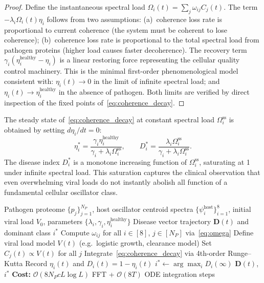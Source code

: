 \documentclass[twocolumn,11pt,a4paper]{article}
\theoremstyle{definition}
\theoremstyle{remark}
\newcommand{\bigO}{\mathcal{O}}
\begin{document}
\begin{proof}
Define the instantaneous spectral load $\Omega_i(t) = \sum_j \omega_{ij} C_j(t)$.
The term $-\lambda_i \Omega_i(t) \eta_i$ follows from two assumptions:
(a)~coherence loss rate is proportional to current coherence (the system must
be coherent to lose coherence); (b)~coherence loss rate is proportional to the
total spectral load from pathogen proteins (higher load causes faster
decoherence). The recovery term $\gamma_i(\eta_i^{\text{healthy}} - \eta_i)$ is
a linear restoring force representing the cellular quality control machinery.
This is the minimal first-order phenomenological model consistent with:
$\eta_i(t) \to 0$ in the limit of infinite spectral load; and
$\eta_i(t) \to \eta_i^{\text{healthy}}$ in the absence of pathogen. Both
limits are verified by direct inspection of the fixed points of~\eqref{eq:coherence_decay}.
\end{proof}

The steady state of~\eqref{eq:coherence_decay} at constant spectral load
$\Omega_i^{\text{ss}}$ is obtained by setting $d\eta_i/dt = 0$:
\begin{equation}
  \eta_i^* = \frac{\gamma_i \eta_i^{\text{healthy}}}{\gamma_i + \lambda_i \Omega_i^{\text{ss}}},
  \qquad
  D_i^* = \frac{\lambda_i \Omega_i^{\text{ss}}}{\gamma_i + \lambda_i \Omega_i^{\text{ss}}}.
  \label{eq:steady_state}
\end{equation}
The disease index $D_i^*$ is a monotone increasing function of $\Omega_i^{\text{ss}}$,
saturating at 1 under infinite spectral load. This saturation captures the
clinical observation that even overwhelming viral loads do not instantly abolish
all function of a fundamental cellular oscillator class.

\begin{algorithm}
\caption{Infection dynamics profiler}
\label{alg:dynamics}
\begin{algorithmic}[1]
\Require Pathogen proteome $\{p_j\}_{j=1}^{N_P}$, host oscillator centroid
  spectra $\{\psi_i^{\text{host}}\}_{i=1}^8$, initial viral load $V_0$,
  parameters $\{\lambda_i, \gamma_i, \eta_i^{\text{healthy}}\}$
\Ensure Disease vector trajectory $\mathbf{D}(t)$ and dominant class $i^*$
\State Compute $\omega_{ij}$ for all $i \in [8]$, $j \in [N_P]$ via~\eqref{eq:omega}
\State Define viral load model $V(t)$ (e.g.\ logistic growth, clearance model)
\State Set $C_j(t) \propto V(t)$ for all $j$
  \State Integrate~\eqref{eq:coherence_decay} via 4th-order Runge--Kutta
  \State Record $\eta_i(t)$ and $D_i(t) = 1 - \eta_i(t)$
\EndFor
\State $i^* \gets \arg\max_i D_i(\infty)$ 
\State \Return $\mathbf{D}(t)$, $i^*$
\State \textbf{Cost:} $\bigO(8 N_P c L \log L)$ FFT + $\bigO(8T)$ ODE integration steps
\end{algorithmic}
\end{algorithm}
\end{document}
